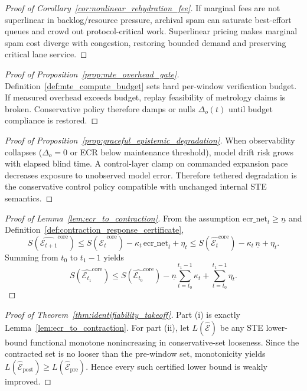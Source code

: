 \documentclass[11pt]{article}
\theoremstyle{definition}
\theoremstyle{plain}
\newcommand{\STE}{\textsf{STE}}
\newcommand{\deltao}{\Delta_o}
\begin{document}
\begin{proof}[Proof of Corollary~\ref{cor:nonlinear_rehydration_fee}]
If marginal fees are not superlinear in backlog/resource pressure, archival spam can saturate best-effort queues and crowd out protocol-critical work.
Superlinear pricing makes marginal spam cost diverge with congestion, restoring bounded demand and preserving critical lane service.
\end{proof}

\begin{proof}[Proof of Proposition~\ref{prop:mte_overhead_gate}]
Definition~\ref{def:mte_compute_budget} sets hard per-window verification budget.
If measured overhead exceeds budget, replay feasibility of metrology claims is broken.
Conservative policy therefore damps or nulls $\deltao(t)$ until budget compliance is restored.
\end{proof}

\begin{proof}[Proof of Proposition~\ref{prop:graceful_epistemic_degradation}]
When observability collapses ($\deltao=0$ or ECR below maintenance threshold), model drift risk grows with elapsed blind time.
A control-layer clamp on commanded expansion pace decreases exposure to unobserved model error.
Therefore tethered degradation is the conservative control policy compatible with unchanged internal \STE{} semantics.
\end{proof}

\begin{proof}[Proof of Lemma~\ref{lem:ecr_to_contraction}]
From the assumption $\mathrm{ecr\_net}_t\ge \underline n$ and Definition~\ref{def:contraction_response_certificate},
\[
S(\widehat{\mathcal{E}_{t+1}}^{\mathrm{core}})
\le
S(\widehat{\mathcal{E}_{t}}^{\mathrm{core}})-\kappa_t\,\mathrm{ecr\_net}_t+\eta_t
\le
S(\widehat{\mathcal{E}_{t}}^{\mathrm{core}})-\kappa_t\,\underline n+\eta_t.
\]
Summing from $t_0$ to $t_1-1$ yields
\[
S\!\left(\widehat{\mathcal{E}_{t_1}}^{\mathrm{core}}\right)\le
S\!\left(\widehat{\mathcal{E}_{t_0}}^{\mathrm{core}}\right)-\underline n\sum_{t=t_0}^{t_1-1}\kappa_t+\sum_{t=t_0}^{t_1-1}\eta_t.
\]
\end{proof}

\begin{proof}[Proof of Theorem~\ref{thm:identifiability_takeoff}]
Part (i) is exactly Lemma~\ref{lem:ecr_to_contraction}.
For part (ii), let $L(\widehat{\mathcal{E}})$ be any \STE{} lower-bound functional monotone nonincreasing in conservative-set looseness.
Since the contracted set is no looser than the pre-window set, monotonicity yields
$L(\widehat{\mathcal{E}}_{\mathrm{post}})\ge L(\widehat{\mathcal{E}}_{\mathrm{pre}})$.
Hence every such certified lower bound is weakly improved.
\end{proof}
\end{document}
